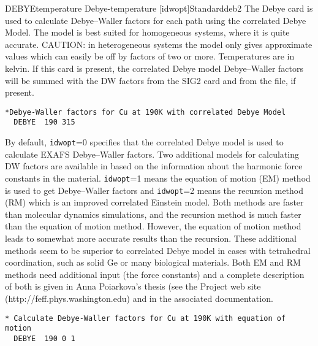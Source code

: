 \documentclass[11pt,oneside]{report} %
\begin{document}
\begin{Card}{DEBYE}{temperature  Debye-temperature [idwopt]}{Standard}{deb2}
  The Debye card is used to calculate Debye--Waller factors for each
  path using the correlated Debye Model. The model is best suited for
  homogeneous systems, where it is quite accurate.  CAUTION: in
  heterogeneous systems the model only gives approximate values which
  can easily be off by factors of two or more.  Temperatures are in
  kelvin.  If this card is present, the correlated Debye model
  Debye--Waller factors will be summed with the DW factors from the
  SIG2 card and from the  file, if present.

\begin{verbatim}
*Debye-Waller factors for Cu at 190K with correlated Debye Model
  DEBYE  190 315
\end{verbatim}

  By default, \texttt{idwopt}=0 specifies that the correlated Debye model is used
  to calculate EXAFS Debye--Waller factors. Two additional models for
  calculating DW factors are available in {\feffcur} based on the information
  about the harmonic force constants in the material.  \texttt{idwopt}=1
  means the equation of motion (EM) method is used to get Debye--Waller
  factors and \texttt{idwopt}=2 means the recursion method (RM) which
  is an improved correlated Einstein model.  Both
  methods are faster than molecular dynamics simulations, and the
  recursion method is much faster than the equation of motion method.
  However, the equation of motion method leads to somewhat more accurate
  results than the recursion. These additional methods seem to be superior to
  correlated Debye model in cases with tetrahedral
  coordination, such as solid Ge or many biological materials.  Both EM and RM
  methods need additional input (the force constants) and a complete
  description of both is given in Anna Poiarkova's thesis (see the
  {\feff} Project web site (http://feff.phys.washington.edu) and
  in the associated documentation.
\begin{verbatim}
* Calculate Debye-Waller factors for Cu at 190K with equation of motion
  DEBYE  190 0 1
\end{verbatim}

\end{Card}
\end{document}
